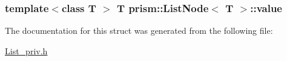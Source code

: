 \subsubsection[{\texorpdfstring{value}{value}}]{\setlength{\rightskip}{0pt plus 5cm}template$<$class T $>$ T {\bf prism\+::\+List\+Node}$<$ T $>$\+::value}\hypertarget{structprism_1_1_list_node_a7e32dda6d1af7a226aced3240b4ef42d}{}\label{structprism_1_1_list_node_a7e32dda6d1af7a226aced3240b4ef42d}


The documentation for this struct was generated from the following file\+:\begin{DoxyCompactItemize}
\item 
\hyperlink{_list__priv_8h}{List\+\_\+priv.\+h}\end{DoxyCompactItemize}
